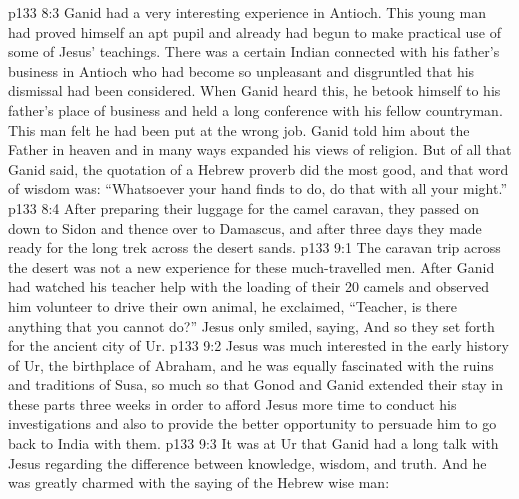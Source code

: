 \vs p133 8:3 \pc Ganid had a very interesting experience in Antioch. This young man had proved himself an apt pupil and already had begun to make practical use of some of Jesus’ teachings. There was a certain Indian connected with his father’s business in Antioch who had become so unpleasant and disgruntled that his dismissal had been considered. When Ganid heard this, he betook himself to his father’s place of business and held a long conference with his fellow countryman. This man felt he had been put at the wrong job. Ganid told him about the Father in heaven and in many ways expanded his views of religion. But of all that Ganid said, the quotation of a Hebrew proverb did the most good, and that word of wisdom was: “Whatsoever your hand finds to do, do that with all your might.”
\vs p133 8:4 After preparing their luggage for the camel caravan, they passed on down to Sidon and thence over to Damascus, and after three days they made ready for the long trek across the desert sands.
\vs p133 9:1 The caravan trip across the desert was not a new experience for these much\hyp{}travelled men. After Ganid had watched his teacher help with the loading of their 20 camels and observed him volunteer to drive their own animal, he exclaimed, “Teacher, is there anything that you cannot do?” Jesus only smiled, saying,  And so they set forth for the ancient city of Ur.
\vs p133 9:2 Jesus was much interested in the early history of Ur, the birthplace of Abraham, and he was equally fascinated with the ruins and traditions of Susa, so much so that Gonod and Ganid extended their stay in these parts three weeks in order to afford Jesus more time to conduct his investigations and also to provide the better opportunity to persuade him to go back to India with them.
\vs p133 9:3 It was at Ur that Ganid had a long talk with Jesus regarding the difference between knowledge, wisdom, and truth. And he was greatly charmed with the saying of the Hebrew wise man: 
